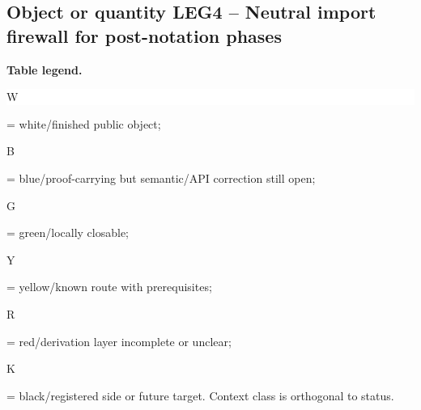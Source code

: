 \subsection*{Object or quantity LEG4 -- Neutral import firewall for post-notation phases}
\hypertarget{objproof:LEG4}{}
\par\smallskip\noindent\begin{minipage}{0.99\linewidth}\footnotesize\raggedright\textbf{Table legend.} \colorbox{white}{\strut W} = white/finished public object; \colorbox{cyan!20}{\strut B} = blue/proof-carrying but semantic/API correction still open; \colorbox{green!18}{\strut G} = green/locally closable; \colorbox{yellow!25}{\strut Y} = yellow/known route with prerequisites; \colorbox{red!20}{\strut R} = red/derivation layer incomplete or unclear; \colorbox{black!18}{\strut K} = black/registered side or future target. Context class is orthogonal to status.\end{minipage}\par\vspace{0.25em}
